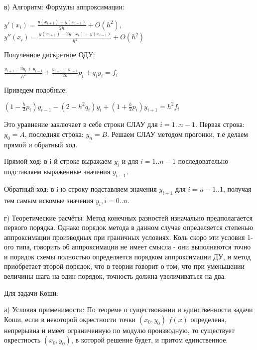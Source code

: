 \documentclass{article}
\begin{document}
	в) Алгоритм: Формулы аппроксимации:
	\begin{center}
		$y'(x_i) = \frac{y(x_{i+1}) - y(x_{i-1})}{2h} + O(h^2)$, $y''(x_i) = \frac{y(x_{i+1}) - 2y(x_i) + y(x_{i-1})}{h^2} + O(h^2)$ \\
	\end{center}
	\hspace{7mm} Полученное дискретное ОДУ:
	\begin{center}
		$\frac{y_{i+1} - 2y_i + y_{i-1}}{h^2} + \frac{y_{i+1} - y_{i-1}}{2h}p_i + q_iy_i = f_i$ \\
	\end{center}
	\hspace{7mm} Приведем подобные:
	\begin{center}
		$(1 - \frac{h}{2}p_i)y_{i-1} - (2 - h^2q_i)y_i + (1 + \frac{h}{2}p_i)y_{i+1} = h^2f_i$ \\
	\end{center}
	\hspace{7mm} Это уравнение заключает в себе строки СЛАУ для $i = 1..n-1$. Первая строка: $y_0 = A$, последняя строка: $y_n = B$. Решаем СЛАУ методом прогонки, т.е делаем прямой и обратный ход.\par
	\hspace{3mm} Прямой ход: в i-й строке выражаем $y_i$ и для $i = 1..n-1$ последовательно подставляем выраженные значения $y_{i-1}$.\par
	\hspace{3mm} Обратный ход: в i-ю строку подставляем значения $y_{i+1}$ для $i = n-1..1$, получая тем самым искомые значения $y_i, i = 0..n$.\par
	г) Теоретические расчёты: Метод конечных разностей изначально предполагается первого порядка. Однако порядок метода в данном случае определяется степенью аппроксимации производных при граничных условиях. Коль скоро эти условия 1-ого типа, говорить об аппроксимации не имеет смысла - они выполняются точно и порядок схемы полностью определяется порядком аппроксимации ДУ, и метод приобретает второй порядок, что в теории говорит о том, что при уменьшении величины шага на один порядок, точность должна увеличиваться на два.\par
	
	Для задачи Коши:
	
	а) Условия применимости: По теореме о существовании и единственности задачи Коши, если в некоторой окрестности точки $(x_0,y_0)$ $f(x)$ определена, непрерывна и имеет ограниченную по модулю производную, то существует окрестность $(x_0,y_0)$, в которой решение будет, и притом единственное. \par
	
\end{document}
